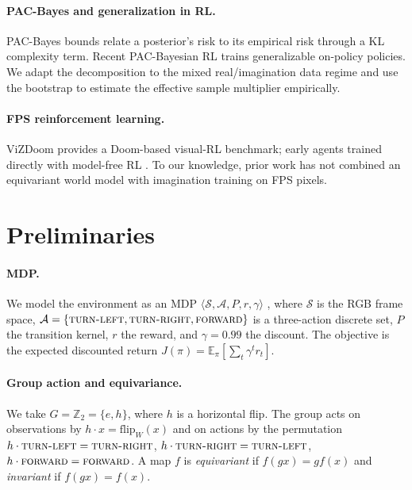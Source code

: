 \documentclass[sigconf,anonymous]{acmart}
\begin{document}
\paragraph{PAC-Bayes and generalization in RL.}
PAC-Bayes bounds \cite{mcallester1999} relate a posterior's risk to its
empirical risk through a KL complexity term. Recent PAC-Bayesian RL
\cite{pacbayesrl2025} trains generalizable on-policy policies. We adapt the
decomposition to the mixed real/imagination data regime and use the bootstrap
\cite{bootstrap1993} to estimate the effective sample multiplier empirically.

\paragraph{FPS reinforcement learning.}
ViZDoom \cite{vizdoom2016} provides a Doom-based visual-RL benchmark; early
agents trained directly with model-free RL \cite{fps2017}. To our knowledge,
prior work has not combined an equivariant world model with imagination
training on FPS pixels.

\section{Preliminaries}\label{sec:prelim}

\paragraph{MDP.}
We model the environment as an MDP
$\langle\mathcal S,\mathcal A,P,r,\gamma\rangle$ \cite{suttonbarto2018},
where $\mathcal S$ is the RGB frame space,
$\mathcal A=\{\textsc{turn-left},\textsc{turn-right},\textsc{forward}\}$ is a
three-action discrete set, $P$ the transition kernel, $r$ the reward, and
$\gamma=0.99$ the discount. The objective is the expected discounted return
$J(\pi)=\mathbb E_{\pi}[\sum_t\gamma^t r_t]$.

\paragraph{Group action and equivariance.}
We take $G=\mathbb Z_2=\{e,h\}$, where $h$ is a horizontal flip. The group
acts on observations by $h\cdot x=\mathrm{flip}_W(x)$ and on actions by the
permutation $h\cdot\textsc{turn-left}=\textsc{turn-right}$,
$h\cdot\textsc{turn-right}=\textsc{turn-left}$,
$h\cdot\textsc{forward}=\textsc{forward}$. A map $f$ is
\emph{equivariant} if $f(gx)=g f(x)$ and \emph{invariant} if $f(gx)=f(x)$.
\end{document}

